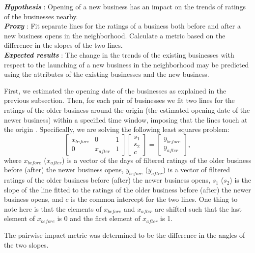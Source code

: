 \documentclass{vldb}
\begin{document}
\textbf{\textit{Hypothesis}} : Opening of a new business has an impact on the trends of ratings of the businesses nearby.\\
\textbf{\textit{Proxy}} : Fit separate lines for the ratings of a business both before and after a new business opens in the neighborhood. Calculate a metric based on the difference in the slopes of the two lines.\\
\textbf{\textit{Expected results}} : The change in the trends of the existing businesses with respect to the launching  of a new business in the neighborhood may be predicted using the attributes of the existing businesses and the new business. 

First, we estimated the opening date of the businesses as explained in the previous subsection. Then, for each pair of businesses we fit two lines for the ratings of the older business around the origin (the estimated opening date of the newer business) within a specified time window, imposing that the lines touch at the origin . Specifically, we are solving the following least squares problem:
\begin{equation*}
 \left [\begin{array}{ccc}x_{before} & 0 & 1 \\
 0 & x_{after} & 1 \end{array} \right ] 
  \left [\begin{array}{c}s_1 \\ s_2 \\ c \end{array} \right ] 
 =  \left [\begin{array}{c}y_{before} \\ y_{after} \end{array} \right ] ,
\end{equation*}
where $x_{before}$  ($x_{after}$) is a vector of the days of filtered ratings of the older business before (after) the newer business opens, $y_{before}$  ($y_{after}$) is a vector of filtered ratings of the older business before  (after) the newer business opens, $s_1$  ($s_2$) is the slope of the line fitted to the ratings of the older business before  (after) the newer business opens, and $c$ is the common intercept for the two lines. One thing to note here is that the elements of $x_{before}$ and $x_{after}$ are shifted such that the last element of $x_{before}$ is 0 and the first element of $x_{after}$ is 1.

The pairwise impact metric was determined to be the difference in the angles of the two slopes. 
\end{document}
